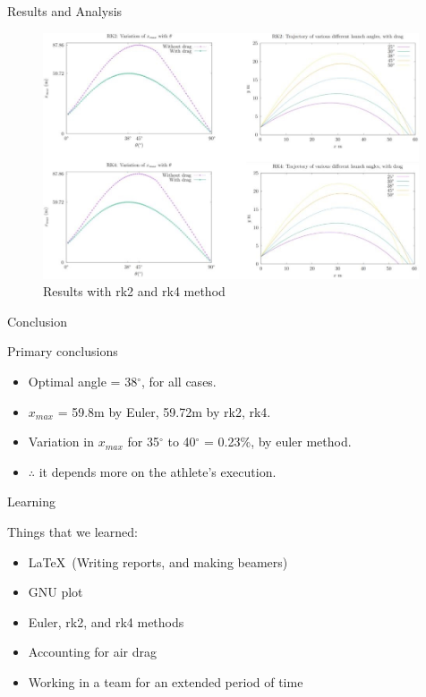 \documentclass{beamer}
\begin{document}
\begin{frame}{Results and Analysis}
\begin{figure}
    \centering
    \includegraphics[width=0.99\textwidth]{fig3.JPG}
    \caption{Results with rk2 and rk4 method}
    \label{fig:fig3.JPEG}
\end{figure}
\end{frame}
\begin{frame}[t]{Conclusion}
    \vspace{6.5pt}
    \begin{block}{Primary conclusions}
    \begin{itemize}
        \item Optimal angle = 38$^\circ$, for all cases.
        \item $x_{max}$ = 59.8m by Euler, 59.72m by rk2, rk4. 
        \item Variation in $x_{max}$ for 35$^\circ$ to 40$^\circ$ = 0.23\%, by euler method.
        \item $\therefore$ it depends more on the athlete's execution.
    \end{itemize}
    \end{block}
\end{frame}
\begin{frame}[t]{Learning}
\vspace{6.5pt}
    \begin{block}{Things that we learned:}
        \begin{itemize}
            \item \LaTeX\, (Writing reports, and making beamers)
            \item GNU plot
            \item Euler, rk2, and rk4 methods
            \item Accounting for air drag
            \item Working in a team for an extended period of time
        \end{itemize}
    \end{block}
\end{frame}
\end{document}
